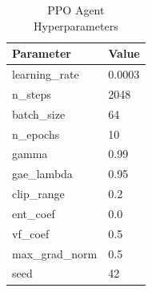 \begin{table}[h]
\caption{PPO Agent Hyperparameters}
\label{tab:ppo_hyperparameters}
\centering
\begin{tabular}{@{}ll@{}}
\toprule
\textbf{Parameter} & \textbf{Value} \\ \midrule
learning\_rate & 0.0003 \\
n\_steps & 2048 \\
batch\_size & 64 \\
n\_epochs & 10 \\
gamma & 0.99 \\
gae\_lambda & 0.95 \\
clip\_range & 0.2 \\
ent\_coef & 0.0 \\
vf\_coef & 0.5 \\
max\_grad\_norm & 0.5 \\
seed & 42 \\
\bottomrule
\end{tabular}
\end{table}
